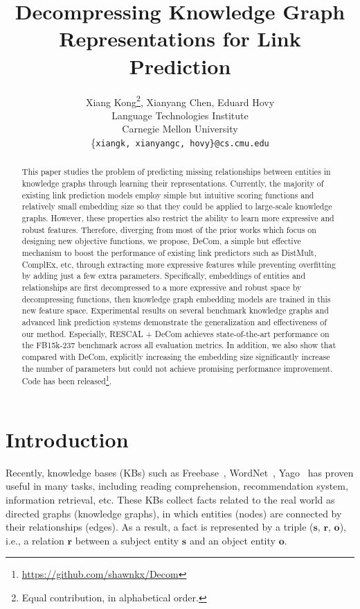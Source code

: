 \documentclass[letterpaper]{article} \usepackage{aaai20}  \usepackage{times}  \usepackage{helvet} \usepackage{courier}  \usepackage{booktabs}
\title{Decompressing Knowledge Graph Representations for Link Prediction}
\author{Xiang Kong\thanks{Equal contribution, in alphabetical order.}, Xianyang Chen\footnotemark[1], Eduard Hovy\\
  Language Technologies Institute\\
  Carnegie Mellon University\\
  \{\tt  xiangk, xianyangc, hovy\}@cs.cmu.edu}
\begin{document}
\maketitle

\begin{abstract}
This paper studies the problem of predicting missing relationships between entities in knowledge graphs through learning their representations. Currently, the majority of existing link prediction models employ simple but intuitive scoring functions and relatively small embedding size so that they could be applied to large-scale knowledge graphs. However, these properties also restrict the ability to learn more expressive and robust features. Therefore, diverging from most of the prior works which focus on designing new objective functions, we propose, DeCom, a simple but effective mechanism to boost the performance of existing link predictors such as DistMult, ComplEx, etc, through extracting more expressive features while preventing overfitting by adding just a few extra parameters.
Specifically, embeddings of entities and relationships are first decompressed to a more expressive and robust space by decompressing functions, then knowledge graph embedding models are trained in this new feature space. Experimental results on several benchmark knowledge graphs and advanced link prediction systems demonstrate the generalization and effectiveness of our method. Especially, RESCAL + DeCom achieves state-of-the-art performance on the FB15k-237 benchmark across all evaluation metrics.
In addition, we also show that compared with DeCom, explicitly increasing the embedding size significantly increase the number of parameters but could not achieve promising performance improvement. Code has been released\footnote{\url{https://github.com/shawnkx/Decom}}.
\end{abstract}



\section{Introduction}
Recently, knowledge bases (KBs) such as Freebase~\cite{bollacker2008freebase}, WordNet~\cite{miller1995wordnet}, Yago~\cite{suchanek2007yago} has proven useful in many tasks, including reading comprehension, recommendation system, information retrieval, etc. These KBs collect facts related to the real world as directed graphs (knowledge graphs), in which entities (nodes) are connected by their relationships (edges). As a result, a fact is represented by a triple ($\mathbf{s}$, $\mathbf{r}$, $\mathbf{o}$), i.e., a relation $\mathbf{r}$ between a subject entity $\mathbf{s}$ and an object entity $\mathbf{o}$. 
\end{document}
